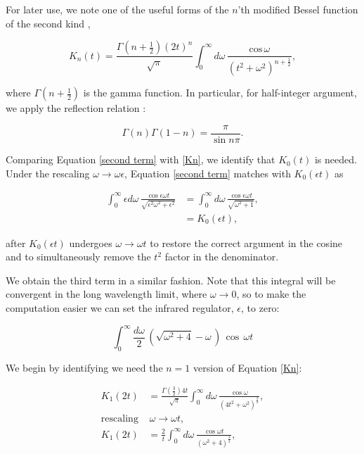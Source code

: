 \documentclass{article}
\numberwithin{equation}{section} %
\begin{document}
For later use, we note one of the useful forms of the $n$'th modified Bessel function of the second kind \cite{bessel},

\begin{equation}
K_n(t) = \frac{\Gamma(n+\frac{1}{2})(2t)^n}{\sqrt{\pi}}\int^\infty_0 d\omega \, \frac{\mathrm{cos \,} \omega}{(t^2 + \omega^2)^{n+\frac{1}{2}}},
\label{Kn}
\end{equation}

\noindent where $\Gamma(n+\frac{1}{2})$ is the gamma function. In particular, for half-integer argument, we apply the reflection relation \cite{reflection}:

\begin{equation}
\Gamma(n)\Gamma(1-n) = \frac{\pi}{\sin n\pi}.
\end{equation}

Comparing Equation \ref{second term} with \ref{Kn}, we identify that $K_0(t)$ is needed. Under the rescaling $\omega \rightarrow \omega\epsilon$, Equation \ref{second term} matches with $K_0(\epsilon t)$ as

\begin{equation}
\begin{split}
\int^\infty_0 \epsilon d\omega \, \frac{\cos \epsilon\omega t}{\sqrt{\epsilon^2\omega^2 + \epsilon^2}} & = \int^\infty_0 d\omega \, \frac{\cos \epsilon\omega t}{\sqrt{\omega^2 + 1}},\\
&= K_0(\epsilon t),
\end{split}
\end{equation}

\noindent after $K_0(\epsilon t)$ undergoes $\omega \rightarrow \omega t$ to restore the correct argument in the cosine and to simultaneously remove the $t^2$ factor in the denominator.

We obtain the third term in a similar fashion. Note that this integral will be convergent in the long wavelength limit, where $\omega\rightarrow 0$, so to make the computation easier we can set the infrared regulator, $\epsilon$, to zero:

\begin{equation}
\int^\infty_0 \frac{d\omega}{2}\, \left(\sqrt{\omega^2 + 4} - \omega\,\right)\, \cos \, \omega t
\label{third term}
\end{equation}

We begin by identifying we need the $n=1$ version of Equation \ref{Kn}:

\begin{equation}
\begin{split}
K_1(2t) &= \frac{\Gamma(\frac{3}{2})4t}{\sqrt{\pi}} \int^\infty_0 d\omega\, 
\frac{\cos \omega }{(4t^2 + \omega^2)^{\frac{3}{2}}},\\
\mathrm{rescaling}\,&\, \omega \rightarrow \omega t,\\
K_1(2t) &=\frac{2}{t} \int^\infty_0 d\omega\, 
\frac{\cos \omega t}{(\omega^2+4)^{\frac{3}{2}}},\\
\end{split}
\label{K1}
\end{equation}
\end{document}
